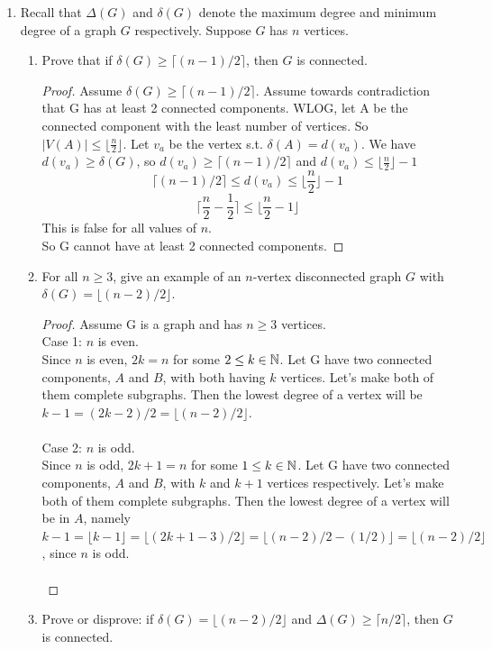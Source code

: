 \documentclass[12pt]{article}
\begin{document}
	\begin{enumerate}

\item Recall that $\Delta(G)$ and $\delta(G)$ denote the maximum degree and minimum degree of a graph $G$ respectively. Suppose $G$ has $n$ vertices.
\begin{enumerate}
\item Prove that if $\delta(G) \geq \lceil (n-1)/2 \rceil$, then $G$ is connected.
\begin{proof}
	Assume $\delta(G) \geq \lceil (n-1)/2 \rceil$. Assume towards contradiction that G has at least 2 connected components. WLOG, let A be the connected component with the least number of vertices. So $|V(A)|\leq \lfloor\frac{n}{2}\rfloor$. Let $v_a$ be the vertex s.t. $\delta(A) = d(v_a)$. We have $d(v_a)\geq \delta(G)$, so $d(v_a)\geq \lceil (n-1)/2 \rceil$ and $d(v_a)\leq \lfloor\frac{n}{2}\rfloor-1$
	\[\lceil (n-1)/2 \rceil \leq d(v_a)\leq \lfloor\frac{n}{2}\rfloor-1\]
	\[\bigg\lceil \frac{n}{2}-\frac{1}{2} \bigg\rceil \leq \bigg\lfloor \frac{n}{2}-1 \bigg\rfloor\]
	This is false for all values of $n$.\contra\\
	So G cannot have at least 2 connected components.
\end{proof}
\item For all $n \geq 3$, give an example of an $n$-vertex disconnected graph  $G$ with $\delta(G) = \lfloor (n-2)/2 \rfloor$.
\begin{proof}
	Assume G is a graph and has $n\geq3$ vertices.\\
	Case 1: $n$ is even.\\
	Since $n$ is even, $2k = n$ for some $2\leq k\in\mathbb{N}$. Let G have two connected components, $A$ and $B$, with both having $k$ vertices. Let's make both of them complete subgraphs. Then the lowest degree of a vertex will be $k-1 = (2k-2)/2 = \lfloor (n-2)/2 \rfloor$.\\\\
	Case 2: $n$ is odd.\\
	Since $n$ is odd, $2k+1 = n$ for some $1\leq k\in\mathbb{N}$. Let G have two connected components, $A$ and $B$, with $k$ and $k+1$ vertices respectively. Let's make both of them complete subgraphs. Then the lowest degree of a vertex will be in $A$, namely $k-1 = \lfloor k-1 \rfloor =\lfloor (2k+1-3)/2 \rfloor = \lfloor (n-2)/2 - (1/2)\rfloor = \lfloor (n-2)/2 \rfloor$, since $n$ is odd.\\\\
\end{proof}
\item Prove or disprove: if $\delta(G) = \lfloor (n-2)/2 \rfloor$ and $\Delta(G) \geq \lceil n/2 \rceil$, then $G$ is connected.  

\end{enumerate}
\end{enumerate}
\end{document}
